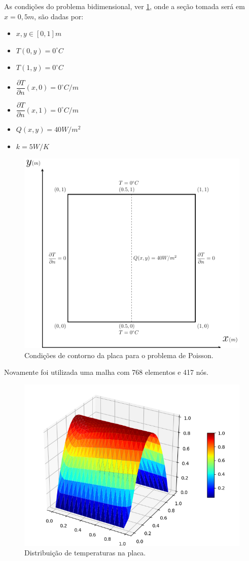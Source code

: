 As condições do problema bidimensional, ver \ref{poisson_d_bc}, onde a seção tomada será em $x=0,5m$, são dadas por:
\begin{itemize}
    \item $x,y\in [0,1]m$
    \item $T(0,y) = 0^{\circ}C$
    \item $T(1,y) = 0^{\circ}C$
    \item $\dfrac{\partial T}{\partial n}(x,0) = 0^{\circ}C/m$
    \item $\dfrac{\partial T}{\partial n}(x,1) = 0^{\circ}C/m$
    \item $Q(x,y) = 40W/m^2$
    \item $k = 5W/K$
\end{itemize}

\begin{figure}[H]
    \centering
    \includegraphics[width=.7\linewidth]{figures/poisson_dirichlet_boundary_conditions.pdf}
    \caption{Condições de contorno da placa para o problema de Poisson.}
    \label{poisson_d_bc}
\end{figure}

Novamente foi utilizada uma malha com 768 elementos e 417 nós.
\begin{figure}[H]
    \centering
    \includegraphics[width=.5\linewidth]{figures/poisson_dirichlet_permanent_3d.png}
    \caption{Distribuição de temperaturas na placa.}
    \label{poisson_d_3d}
\end{figure}


